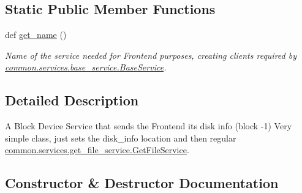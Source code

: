 \subsection*{Static Public Member Functions}
\begin{DoxyCompactItemize}
\item 
def \hyperlink{class_r_a_i_d5_1_1block__device_1_1services_1_1get__disk__info__service_1_1_get_disk_info_service_acdcf11106f83ada86ec5a72c0eb8b938}{get\+\_\+name} ()
\begin{DoxyCompactList}\small\item\em Name of the service needed for Frontend purposes, creating clients required by \hyperlink{class_r_a_i_d5_1_1common_1_1services_1_1base__service_1_1_base_service}{common.\+services.\+base\+\_\+service.\+Base\+Service}. \end{DoxyCompactList}\end{DoxyCompactItemize}


\subsection{Detailed Description}
A Block Device Service that sends the Frontend it\textquotesingle{}s disk info (block -\/1) Very simple class, just sets the disk\+\_\+info location and then regular \hyperlink{class_r_a_i_d5_1_1common_1_1services_1_1get__file__service_1_1_get_file_service}{common.\+services.\+get\+\_\+file\+\_\+service.\+Get\+File\+Service}. 

\subsection{Constructor \& Destructor Documentation}
\mbox{\label{class_r_a_i_d5_1_1block__device_1_1services_1_1get__disk__info__service_1_1_get_disk_info_service_a24750dbde71ba0f0c2048e38e64258fa}} 
